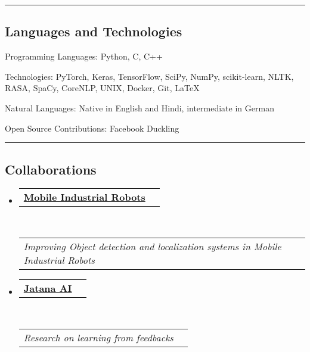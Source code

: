 \documentclass[10pt,letterpaper]{article}
\makeatletter
\newenvironment{indentsection}[1]%
{\begin{list}{}%
	{\setlength{\leftmargin}{#1}}%
	\item[]%
}
{\end{list}}
\newcommand{\headerrow}[2]
{\begin{tabular*}{\linewidth}{l@{\extracolsep{\fill}}r}
	#1 &
	#2 \\
\end{tabular*}}
\makeatother
\begin{document}
\hrule
\vspace{-0.4em}
\subsection*{Languages and Technologies}

\begin{indentsection}{\parindent}
\begin{description*}
	\item[Programming Languages:]
	Python, C, C++
	\item[Technologies:]
	PyTorch, Keras, TensorFlow, SciPy, NumPy, scikit-learn, NLTK, RASA, SpaCy, CoreNLP, UNIX, Docker, Git, \LaTeX
	\item[Natural Languages:]
	Native in English and Hindi, intermediate in German	
	\item[Open Source Contributions:]
	Facebook Duckling
\end{description*}
\end{indentsection}

\hrule
\vspace{-0.4em}
\subsection*{Collaborations}

\begin{itemize}
	\parskip=0.1em
	
	\item 
	\headerrow
		{\textbf{\href{http://www.mobile-industrial-robots.com/en/}{Mobile Industrial Robots}}}
			{\textbf{}}
	\\
	\headerrow
		{\emph{Improving Object detection and localization systems in Mobile Industrial Robots}}
		{\emph{}}
	
    	\item 
	\headerrow
		{\textbf{\href{https://www.jatana.ai/}{Jatana AI}}}
			{\textbf{}}
	\\
	\headerrow
		{\emph{Research on learning from feedbacks}}
		{\emph{}}
	
\end{itemize}
\end{document}
